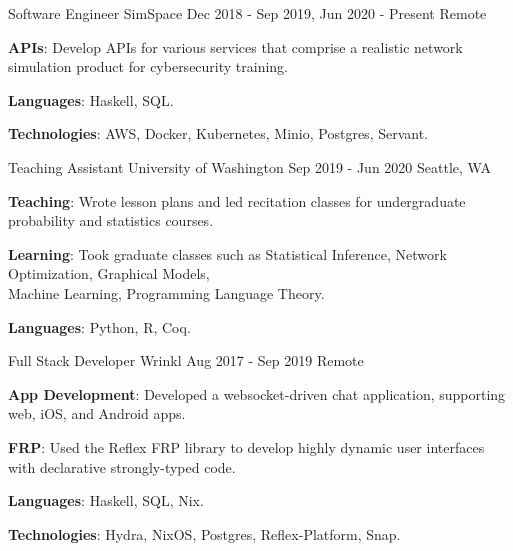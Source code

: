 

\begin{cventries}

  \longdatecventry
    {Software Engineer}
    {SimSpace}
    {Dec 2018 - Sep 2019, Jun 2020 - Present}
    {Remote}
    {
      \begin{cvitems}
        \item {\color{graytext}\textbf{APIs}}: Develop APIs for various services
          that comprise a realistic network simulation product for cybersecurity
          training.
        \item {\color{graytext}\textbf{Languages}}: Haskell, SQL.
        \item {\color{graytext}\textbf{Technologies}}: AWS, Docker, Kubernetes,
          Minio, Postgres, Servant.
      \end{cvitems}
    }

  \cventry
    {Teaching Assistant}
    {University of Washington}
    {Sep 2019 - Jun 2020}
    {Seattle, WA}
    {
      \begin{cvitems}
      \item {\color{graytext}\textbf{Teaching}}: Wrote lesson plans and led recitation classes
        for undergraduate probability and statistics courses.
      \item {\color{graytext}\textbf{Learning}}: Took graduate classes such as Statistical Inference, Network
        Optimization, Graphical Models,\\ Machine Learning, Programming Language
        Theory.
        \item {\color{graytext}\textbf{Languages}}: Python, R, Coq.
      \end{cvitems}
    }


  \cventry
    {Full Stack Developer}
    {Wrinkl}
    {Aug 2017 - Sep 2019}
    {Remote}
    {
      \begin{cvitems}
        \item {\color{graytext}\textbf{App Development}}: Developed a
          websocket-driven chat application, supporting
          web, iOS, and Android apps.
        \item {\color{graytext}\textbf{FRP}}: Used the Reflex FRP library to
          develop highly dynamic user interfaces with declarative strongly-typed
          code.
        \item {\color{graytext}\textbf{Languages}}: Haskell, SQL, Nix.
        \item {\color{graytext}\textbf{Technologies}}: Hydra, NixOS, Postgres,
          Reflex-Platform, Snap.
      \end{cvitems}
    }


\end{cventries}
